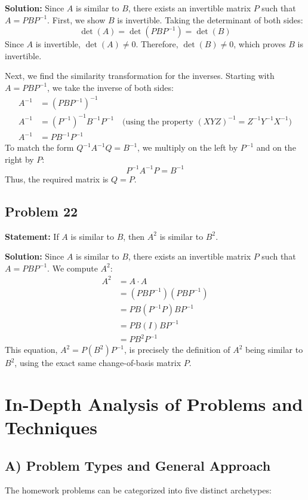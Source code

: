 \documentclass[11pt, a4paper]{article}
\theoremstyle{definition}
\theoremstyle{remark}
\begin{document}
\textbf{Solution:}
Since $A$ is similar to $B$, there exists an invertible matrix $P$ such that $A = PBP^{-1}$.
First, we show $B$ is invertible. Taking the determinant of both sides:
\[
\det(A) = \det(PBP^{-1}) = \det(B)
\]
Since $A$ is invertible, $\det(A) \neq 0$. Therefore, $\det(B) \neq 0$, which proves $B$ is invertible.

Next, we find the similarity transformation for the inverses. Starting with $A = PBP^{-1}$, we take the inverse of both sides:
\begin{align*}
    A^{-1} &= (PBP^{-1})^{-1} \\
    A^{-1} &= (P^{-1})^{-1} B^{-1} P^{-1} \quad \text{(using the property } (XYZ)^{-1} = Z^{-1}Y^{-1}X^{-1} \text{)} \\
    A^{-1} &= P B^{-1} P^{-1}
\end{align*}
To match the form $Q^{-1}A^{-1}Q = B^{-1}$, we multiply on the left by $P^{-1}$ and on the right by $P$:
\[
P^{-1} A^{-1} P = B^{-1}
\]
Thus, the required matrix is $Q = P$.

\subsection{Problem 22}
\textbf{Statement:} If $A$ is similar to $B$, then $A^2$ is similar to $B^2$.

\textbf{Solution:}
Since $A$ is similar to $B$, there exists an invertible matrix $P$ such that $A = PBP^{-1}$.
We compute $A^2$:
\begin{align*}
    A^2 &= A \cdot A \\
    &= (PBP^{-1})(PBP^{-1}) \\
    &= PB(P^{-1}P)BP^{-1} \\
    &= PB(I)BP^{-1} \\
    &= PB^2P^{-1}
\end{align*}
This equation, $A^2 = P(B^2)P^{-1}$, is precisely the definition of $A^2$ being similar to $B^2$, using the exact same change-of-basis matrix $P$.

\newpage
\section{In-Depth Analysis of Problems and Techniques}

\subsection{A) Problem Types and General Approach}
The homework problems can be categorized into five distinct archetypes:
\end{document}
